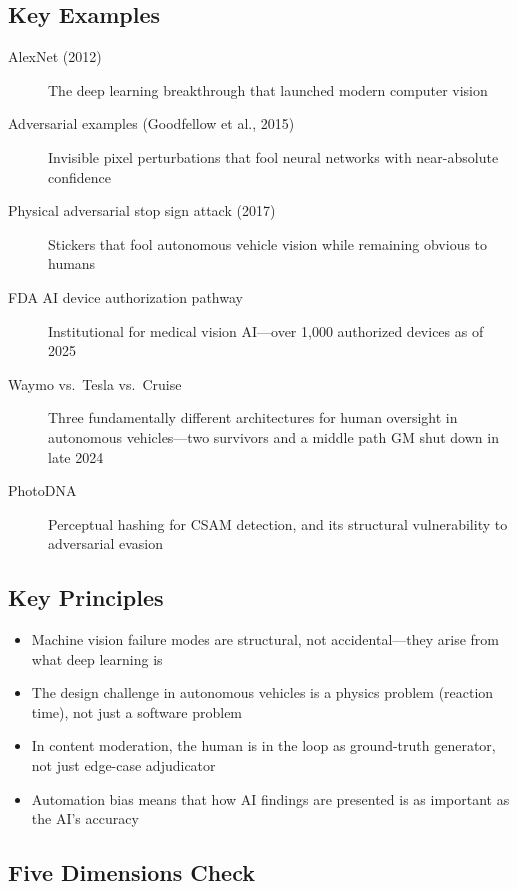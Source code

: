 \subsection*{Key Examples}

\begin{description}
    \item[AlexNet (2012)] The deep learning breakthrough that launched modern computer vision
    \item[Adversarial examples (Goodfellow et al., 2015)] Invisible pixel perturbations that fool neural networks with near-absolute confidence
    \item[Physical adversarial stop sign attack (2017)] Stickers that fool autonomous vehicle vision while remaining obvious to humans
    \item[FDA AI device authorization pathway] Institutional \hitl for medical vision AI---over 1,000 authorized devices as of 2025
    \item[Waymo vs.\ Tesla vs.\ Cruise] Three fundamentally different architectures for human oversight in autonomous vehicles---two survivors and a middle path GM shut down in late 2024
    \item[PhotoDNA] Perceptual hashing for CSAM detection, and its structural vulnerability to adversarial evasion
\end{description}

\subsection*{Key Principles}

\begin{itemize}
    \item Machine vision failure modes are structural, not accidental---they arise from what deep learning is
    \item The \hitl design challenge in autonomous vehicles is a physics problem (reaction time), not just a software problem
    \item In content moderation, the human is in the loop as ground-truth generator, not just edge-case adjudicator
    \item Automation bias means that how AI findings are presented is as important as the AI's accuracy
\end{itemize}

\subsection*{Five Dimensions Check}

